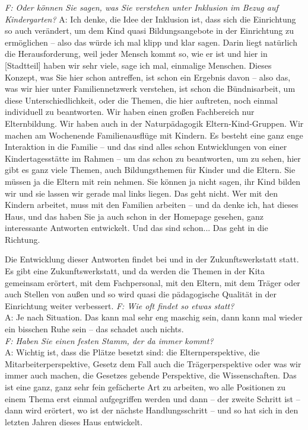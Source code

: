 \begin{linenumbers*}
\emph{F: Oder können Sie sagen, was Sie verstehen unter Inklusion im Bezug auf Kindergarten?}
A: Ich denke, die Idee der Inklusion ist, dass sich die Einrichtung so auch
verändert, um dem Kind quasi Bildungsangebote in der Einrichtung zu ermöglichen
-- also das würde ich mal klipp und klar sagen. Darin liegt natürlich die
Herausforderung, weil jeder Mensch kommt so, wie er ist und hier in
{[Stadtteil]} haben wir sehr viele, sage ich mal, einmalige Menschen. Dieses Konzept, was Sie hier schon antreffen, ist schon ein Ergebnis davon -- also das, was wir hier unter Familiennetzwerk verstehen, ist schon die Bündnisarbeit, um diese Unterschiedlichkeit, oder die Themen, die hier auftreten, noch einmal individuell zu beantworten. 
Wir haben einen großen Fachbereich nur Elternbildung. Wir haben auch in der Naturpädagogik Eltern-Kind-Gruppen. Wir machen am Wochenende Familienausflüge mit Kindern. Es besteht eine ganz enge Interaktion in die Familie -- und das sind alles schon Entwicklungen von einer Kindertagesstätte im Rahmen -- um das schon zu beantworten, um zu sehen, hier gibt es ganz viele Themen, auch Bildungsthemen für Kinder und die Eltern.
Sie müssen ja die Eltern mit rein nehmen. Sie können ja nicht sagen, ihr Kind bilden wir und sie lassen wir gerade mal links liegen. Das geht nicht. Wer mit den Kindern arbeitet, muss mit den Familien arbeiten -- und da denke ich, hat dieses Haus, und das haben Sie ja auch schon in der Homepage gesehen, ganz interessante Antworten entwickelt. Und das sind schon... Das geht in die Richtung.  

Die Entwicklung dieser Antworten findet bei und in der Zukunftswerkstatt statt. Es gibt eine Zukunftswerkstatt, und da werden die Themen in der Kita gemeinsam erörtert, mit dem Fachpersonal, mit den Eltern, mit dem Träger oder auch Stellen von außen und so wird quasi die pädagogische Qualität in der Einrichtung weiter verbessert.
\emph{F: Wie oft findet so etwas statt?}\\
A: Je nach Situation. Das kann mal sehr eng maschig sein, dann kann mal wieder ein bisschen Ruhe sein -- das schadet auch nichts.\\ 
\emph{F: Haben Sie einen festen Stamm, der da immer kommt?}\\
A: Wichtig ist, dass die Plätze besetzt sind: die Elternperspektive, die Mitarbeiterperspektive, Gesetz dem Fall auch die Trägerperspektive oder was wir immer auch machen, die Gesetzes gebende Perspektive, die Wissenschaften. Das ist eine ganz, ganz sehr fein gefächerte Art zu arbeiten, wo alle Positionen zu einem Thema erst einmal aufgegriffen werden und dann -- der zweite Schritt ist -- dann wird erörtert, wo ist der nächste Handlungsschritt -- und so hat sich in den letzten Jahren dieses Haus entwickelt. 


\end{linenumbers*}

